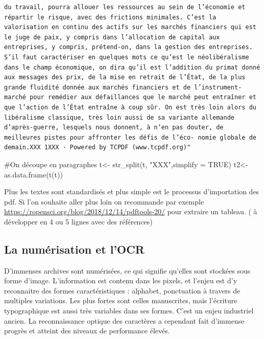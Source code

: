 \documentclass[
  letterpaper,
  DIV=11,
  numbers=noendperiod]{scrreprt}
\newenvironment{Shaded}{\begin{snugshade}}{\end{snugshade}}
\newcommand{\AttributeTok}[1]{\textcolor[rgb]{0.40,0.45,0.13}{#1}}
\newcommand{\CommentTok}[1]{\textcolor[rgb]{0.37,0.37,0.37}{#1}}
\newcommand{\ConstantTok}[1]{\textcolor[rgb]{0.56,0.35,0.01}{#1}}
\newcommand{\FunctionTok}[1]{\textcolor[rgb]{0.28,0.35,0.67}{#1}}
\newcommand{\NormalTok}[1]{\textcolor[rgb]{0.00,0.23,0.31}{#1}}
\newcommand{\OtherTok}[1]{\textcolor[rgb]{0.00,0.23,0.31}{#1}}
\newcommand{\StringTok}[1]{\textcolor[rgb]{0.13,0.47,0.30}{#1}}
\begin{document}
\begin{verbatim}
du travail, pourra allouer les ressources au sein de l’économie et répartir le risque, avec des frictions minimales. C’est la valorisation en continu des actifs sur les marchés financiers qui est le juge de paix, y compris dans l’allocation de capital aux entreprises, y compris, prétend‑on, dans la gestion des entreprises. S’il faut caractériser en quelques mots ce qu’est le néolibéralisme dans le champ économique, on dira qu’il est l’addition du primat donné aux messages des prix, de la mise en retrait de l’État, de la plus grande fluidité donnée aux marchés financiers et de l’instrument-marché pour remédier aux défaillances que le marché peut entraîner et que l’action de l’État entraîne à coup sûr. On est très loin alors du libéralisme classique, très loin aussi de sa variante allemande d’après‑guerre, lesquels nous donnent, à n’en pas douter, de meilleures pistes pour affronter les défis de l’éco‑ nomie globale de demain.XXX 1XXX · Powered by TCPDF (www.tcpdf.org)"
\end{verbatim}

\begin{Shaded}
\begin{Highlighting}[]
\CommentTok{\#On découpe en paragraphes}
\NormalTok{t}\OtherTok{\textless{}{-}} \FunctionTok{str\_split}\NormalTok{(t, }\StringTok{"XXX"}\NormalTok{,}\AttributeTok{simplify =} \ConstantTok{TRUE}\NormalTok{)}
\NormalTok{t2}\OtherTok{\textless{}{-}}\FunctionTok{as.data.frame}\NormalTok{(}\FunctionTok{t}\NormalTok{(t))}
\end{Highlighting}
\end{Shaded}

Plus les textes sont standardisés et plus simple est le processus
d'importation des pdf. Si l'on souhaite aller plus loin on recommande
par exemple \url{https://ropensci.org/blog/2018/12/14/pdftools-20/} pour
extraire un tableau. ( à développer en 4 ou 5 lignes avec des
références)

\subsection{La numérisation et l'OCR}\label{la-numuxe9risation-et-locr}

D'immenses archives sont numérisées, ce qui signifie qu'elles sont
stockées sous forme d'image. L'information est contenu dans les pixels,
et l'enjeu est d'y reconnaitre des formes caractéristiques : alphabet,
ponctuation à travers de multiples variations. Les plus fortes sont
celles manuscrites, mais l'écriture typographique est aussi très
variables dans ses formes. C'est un enjeu industriel ancien. La
reconnaissance optique des caractères a cependant fait d'immense progrès
et atteint des niveaux de performance élevés.
\end{document}
